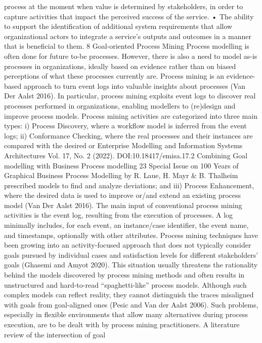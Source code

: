 process at the moment when value is determined
by stakeholders, in order to capture activities
that impact the perceived success of the service.
• The ability to support the identification of additional system requirements that allow organizational actors to integrate a service’s outputs
and outcomes in a manner that is beneficial to
them.
8 Goal-oriented Process Mining
Process modelling is often done for future to-be
processes. However, there is also a need to model
as-is processes in organizations, ideally based
on evidence rather than on biased perceptions of
what these processes currently are. Process mining is an evidence-based approach to turn event
logs into valuable insights about processes (Van
Der Aalst 2016). In particular, process mining
exploits event logs to discover real processes performed in organizations, enabling modellers to
(re)design and improve process models. Process
mining activities are categorized into three main
types: i) Process Discovery, where a workflow
model is inferred from the event logs; ii) Conformance Checking, where the real processes and
their instances are compared with the desired or
Enterprise Modelling and Information Systems Architectures
Vol. 17, No. 2 (2022). DOI:10.18417/emisa.17.2
Combining Goal modelling with Business Process modelling 23
Special Issue on 100 Years of Graphical Business Process Modelling by R. Laue, H. Mayr & B. Thalheim
prescribed models to find and analyze deviations;
and iii) Process Enhancement, where the desired
data is used to improve or/and extend an existing
process model (Van Der Aalst 2016).
The main input of conventional process mining
activities is the event log, resulting from the execution of processes. A log minimally includes, for
each event, an instance/case identifier, the event
name, and timestamps, optionally with other attributes. Process mining techniques have been
growing into an activity-focused approach that
does not typically consider goals pursued by individual cases and satisfaction levels for different
stakeholders’ goals (Ghasemi and Amyot 2020).
This situation usually threatens the rationality behind the models discovered by process mining
methods and often results in unstructured and
hard-to-read “spaghetti-like” process models. Although such complex models can reflect reality,
they cannot distinguish the traces misaligned with
goals from goal-aligned ones (Pesic and Van der
Aalst 2006). Such problems, especially in flexible
environments that allow many alternatives during
process execution, are to be dealt with by process
mining practitioners.
A literature review of the intersection of goal
